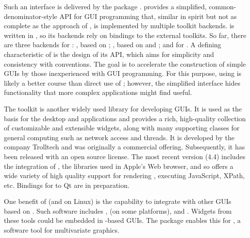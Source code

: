 \documentclass[article,shortnames]{jss}
\begin{document}
Such an interface is delivered by the  package
\citep{gWidgets}.  provides a simplified,
common-denominator-style API for GUI programming that, similar in
spirit but not as complete as the approach of , is
implemented by multiple toolkit backends.  is written in
, so its backends rely on bindings to the external
toolkits. So far, there are three backends for :
, based on ; , based
on  and ; and  for
.  A defining characteristic of  is the
design of its API, which aims for simplicity and consistency with
 conventions.  The goal is to accelerate the construction
of simple GUIs by those inexperienced with GUI programming. For this
purpose, using  is likely a better course than direct
use of ; however, the simplified interface hides
functionality that more complex applications might find useful.

The  toolkit \citep{Qt} is another widely used 
library for developing GUIs. It is used as the basis for the 
desktop and applications \citep{KDE} and provides a rich, high-quality
collection of customizable and extensible widgets, along with many
supporting classes for general computing such as network access and
threads. It is developed by the company Trolltech and was originally a
commercial offering. Subsequently, it has been released with an open
source license.  The most recent version (4.4) includes the
integration of  \citep{WebKit}, the libraries used in
Apple's  Web browser, and so offers a wide variety of high
quality support for rendering , executing JavaScript,
XPath, etc.  Bindings for  to Qt are in preparation.


One benefit of  (and  on Linux) is the
capability to integrate with other GUIs based on .
Such software includes ,  (on some
platforms), and . Widgets from these tools could be
embedded in -based GUIs. The  package enables
this for , a software tool for multivariate graphics. 
\end{document}
